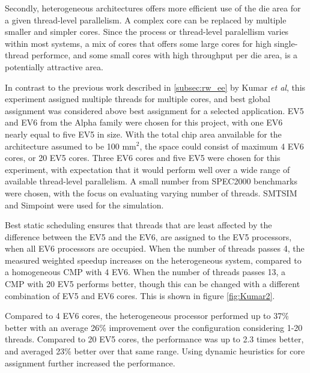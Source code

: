 Secondly, heterogeneous architectures offers more efficient use of the die area for a given thread-level parallelism.
A complex core can be replaced by multiple smaller and simpler cores. 
Since the process or thread-level paralellism varies within most systems, a mix of cores that offers some large cores for high single-thread performce, and some small cores with high throughput per die area, is a potentially attractive area. \cite{heterogeneous-perf}

In contrast to the previous work described in \ref{subsec:rw_ee} by Kumar \textit{et al}, this experiment assigned multiple threads for multiple cores, and best global assignment was considered above best assignment for a selected application.
EV5 and EV6 from the Alpha family were chosen for this project, with one EV6 nearly equal to five EV5 in size.
With the total chip area anvailable for the architecture assumed to be 100 mm$^2$, the space could consist of maximum 4 EV6 cores, or 20 EV5 cores.
Three EV6 cores and five EV5 were chosen for this experiment, with expectation that it would perform well over a wide range of available thread-level parallelism. 
A small number from SPEC2000 benchmarks were chosen, with the focus on evaluating varying number of threads.
SMTSIM and Simpoint were used for the simulation.


Best static scheduling ensures that threads that are least affected by the difference between the EV5 and the EV6, are assigned to the EV5 processors, when all EV6 processors are occupied.
When the number of threads passes 4, the measured weighted speedup increases on the heterogeneous system, compared to a homogeneous CMP with 4 EV6.
When the number of threads passes 13, a CMP with 20 EV5 performs better, though this can be changed with a different combination of EV5 and EV6 cores.
This is shown in figure \ref{fig:Kumar2}.

Compared to 4 EV6 cores, the heterogeneous processor performed up to 37\% better with an average 26\% improvement over the configuration considering 1-20 threads. 
Compared to 20 EV5 cores, the performance was up to 2.3 times better, and averaged 23\% better over that same range. \cite{heterogeneous-perf}
Using dynamic heuristics for core assignment further increased the performance.

